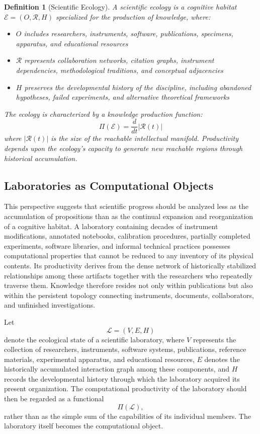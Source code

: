 \documentclass[12pt,oneside]{article}
\newtheorem{definition}{Definition}[section]
\theoremstyle{remark}
\begin{document}
\begin{definition}[Scientific Ecology]
A scientific ecology is a cognitive habitat \(\mathcal{E} = (O, \mathcal{R}, H)\) specialized for the production of knowledge, where:
\begin{itemize}
\item \(O\) includes researchers, instruments, software, publications, specimens, apparatus, and educational resources
\item \(\mathcal{R}\) represents collaboration networks, citation graphs, instrument dependencies, methodological traditions, and conceptual adjacencies
\item \(H\) preserves the developmental history of the discipline, including abandoned hypotheses, failed experiments, and alternative theoretical frameworks
\end{itemize}
The ecology is characterized by a knowledge production function:
\[
\Pi(\mathcal{E}) = \frac{d}{dt} |\mathcal{R}(t)|
\]
where \(|\mathcal{R}(t)|\) is the size of the reachable intellectual manifold. Productivity depends upon the ecology's capacity to generate new reachable regions through historical accumulation.
\end{definition}

\subsection{Laboratories as Computational Objects}

This perspective suggests that scientific progress should be analyzed less as the accumulation of propositions than as the continual expansion and reorganization of a cognitive habitat. A laboratory containing decades of instrument modifications, annotated notebooks, calibration procedures, partially completed experiments, software libraries, and informal technical practices possesses computational properties that cannot be reduced to any inventory of its physical contents. Its productivity derives from the dense network of historically stabilized relationships among these artifacts together with the researchers who repeatedly traverse them. Knowledge therefore resides not only within publications but also within the persistent topology connecting instruments, documents, collaborators, and unfinished investigations.

Let
\[
\mathcal{L} = (V, E, H)
\]
denote the ecological state of a scientific laboratory, where \(V\) represents the collection of researchers, instruments, software systems, publications, reference materials, experimental apparatus, and educational resources, \(E\) denotes the historically accumulated interaction graph among these components, and \(H\) records the developmental history through which the laboratory acquired its present organization. The computational productivity of the laboratory should then be regarded as a functional
\[
\Pi(\mathcal{L}),
\]
rather than as the simple sum of the capabilities of its individual members. The laboratory itself becomes the computational object.
\end{document}
